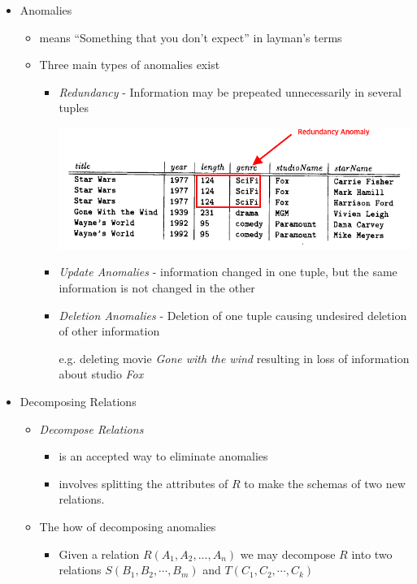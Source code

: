 \documentclass[12pt]{article}
\begin{document}
\begin{enumerate}[1.]
\begin{itemize}
        \item Anomalies
        \begin{itemize}
            \item means ``Something that you don't expect'' in layman's terms
            \item Three main types of anomalies exist
            \begin{itemize}
                \item \textit{Redundancy} - Information may be prepeated unnecessarily in several tuples

                \bigskip

                \begin{center}
                \includegraphics[width=0.7\linewidth]{images/worksheet_12_solution_3.png}
                \end{center}

                \item \textit{Update Anomalies} - information changed in one
                tuple, but the same information is not changed in the other

                \item \textit{Deletion Anomalies} - Deletion of one tuple causing
                undesired deletion of other information

                \bigskip

                e.g. deleting movie \textit{Gone with the wind} resulting
                in loss of information about studio \textit{Fox}


            \end{itemize}
        \end{itemize}

        \item Decomposing Relations
        \begin{itemize}
            \item \textit{Decompose Relations}
            \begin{itemize}
                \item is an accepted way to eliminate anomalies
                \item involves splitting the attributes of $R$ to make the schemas of two new relations.
            \end{itemize}
            \item The how of decomposing anomalies
            \begin{itemize}
                \item Given a relation $R(A_1,A_2,...,A_n)$ we may decompose
                $R$ into two relations $S(B_1, B_2, \cdots, B_m)$ and $T(C_1, C_2, \cdots, C_k)$


\end{itemize}
\end{itemize}
\end{itemize}
\end{enumerate}
\end{document}
